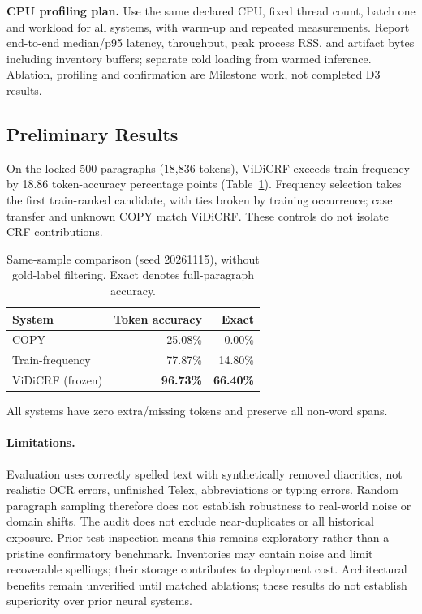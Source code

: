 \documentclass{article}
\begin{document}
\textbf{CPU profiling plan.} Use the same declared CPU, fixed thread count, batch one and workload for all systems, with warm-up and repeated measurements. Report end-to-end median/p95 latency, throughput, peak process RSS, and artifact bytes including inventory buffers; separate cold loading from warmed inference. Ablation, profiling and confirmation are Milestone work, not completed D3 results.

\subsection{Preliminary Results}
On the locked 500 paragraphs (18,836 tokens), ViDiCRF exceeds train-frequency by 18.86 token-accuracy percentage points (Table~\ref{tab:preliminary}). Frequency selection takes the first train-ranked candidate, with ties broken by training occurrence; case transfer and unknown COPY match ViDiCRF. These controls do not isolate CRF contributions.

\begin{table}[!ht]
\caption{Same-sample comparison (seed 20261115), without gold-label filtering. Exact denotes full-paragraph accuracy.}
\label{tab:preliminary}
\centering
\begin{tabular}{lrr}
\toprule
System & Token accuracy & Exact\\
\midrule
COPY & 25.08\% & 0.00\%\\
Train-frequency & 77.87\% & 14.80\%\\
ViDiCRF (frozen) & \textbf{96.73\%} & \textbf{66.40\%}\\
\bottomrule
\end{tabular}
\end{table}
All systems have zero extra/missing tokens and preserve all non-word spans.

\paragraph{Limitations.}
Evaluation uses correctly spelled text with synthetically removed diacritics, not realistic OCR errors, unfinished Telex, abbreviations or typing errors. Random paragraph sampling therefore does not establish robustness to real-world noise or domain shifts. The audit does not exclude near-duplicates or all historical exposure. Prior test inspection means this remains exploratory rather than a pristine confirmatory benchmark. Inventories may contain noise and limit recoverable spellings; their storage contributes to deployment cost. Architectural benefits remain unverified until matched ablations; these results do not establish superiority over prior neural systems.
\end{document}
